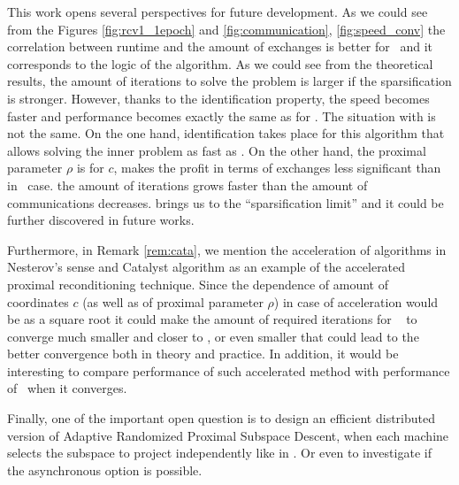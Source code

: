 This work opens several perspectives for future development. As we could see from the Figures \ref{fig:rcv1_1epoch} and \ref{fig:communication}, \ref{fig:speed_conv} the correlation between runtime and the amount of exchanges is better for \spyI~and it corresponds to the logic of the algorithm. As we could see from the theoretical results, the amount of iterations to solve the problem is larger if the sparsification is stronger. However, thanks to the identification property, the speed becomes faster and performance becomes exactly the same as for \dave. The situation with \recoalgo is not the same. On the one hand, identification takes place for this algorithm that allows solving the inner problem as fast as \dave. On the other hand, the proximal parameter $\rho$ is  for  $c$,  makes the profit in terms of exchanges less significant than in \spyI~case.  the amount of iterations grows faster than the amount of communications decreases.  brings us to the ``sparsification limit''  and it could be further discovered in future works. 

Furthermore, in Remark \ref{rem:cata}, we mention the acceleration of algorithms in Nesterov's sense and Catalyst algorithm as an example of the accelerated proximal reconditioning technique. Since the dependence of amount of coordinates $c$ (as well as of proximal parameter $\rho$) in case of acceleration would be as a square root it could make the amount of required iterations for \spyI~ to converge much smaller and closer to \dave, or even smaller that could lead to the better convergence both in theory and practice. In addition, it would be interesting to compare performance of such accelerated method with performance of \spyI~when it converges.

Finally, one of the important open question is to design an efficient distributed version of Adaptive Randomized Proximal Subspace Descent, when each machine selects the subspace to project independently like in \cite{mishchenko201999}. Or even to investigate if the asynchronous option is possible.


